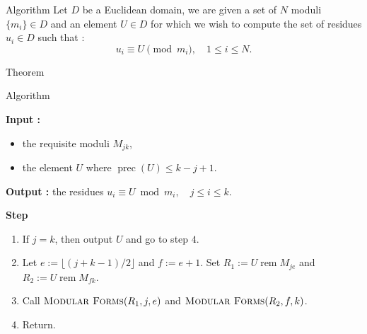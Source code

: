 \begin{frame}{Algorithm}
    Let $D$ be a Euclidean domain, we are given a set of $N$ moduli $\{m_i\}\in D$ and an element $U\in D$ for which we wish to compute the set of residues $u_i\in D$ such that : 
    \[u_i \equiv U \pmod{m_i}, \quad 1\leq i\leq N.\]

    \begin{block}{Theorem}
    \end{block}
\end{frame}

\begin{frame}{Algorithm}

\newline
\newline
\textbf{Input : } \begin{itemize}
    \item the requisite moduli $M_{jk}$,
    \item the element $U$ where $\operatorname{prec}(U)\leq k-j+1$.
\end{itemize}
\textbf{Output : } the residues $u_i \equiv U \bmod{m_i}, \quad j\leq i\leq k$.

\textbf{Step}
\begin{enumerate}
    \item If $j=k$, then output $U$ and go to step $4$.
    \item Let $e := \lfloor (j+k-1)/2\rfloor$ and $f := e+1$. Set $R_1 := U \operatorname{rem} M_{je}$ and $R_2 := U \operatorname{rem} M_{fk}$.
    \item Call $\textsc{Modular Forms}(R_1, j,e)$ and $\textsc{Modular Forms}(R_2, f,k)$.
    \item Return.
\end{enumerate}

\end{frame}